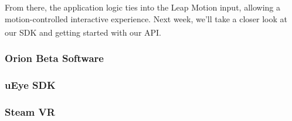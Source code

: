 From there, the application logic ties into the Leap Motion input, allowing a motion-controlled interactive experience. Next week, we’ll take a closer look at our SDK and getting started with our API.\textsuperscript{\cite{website:LeapMotionBlog}}

\subsubsection{Orion Beta Software} \label{OBS}

\subsubsection{uEye SDK}
\subsubsection{Steam VR}


\newpage